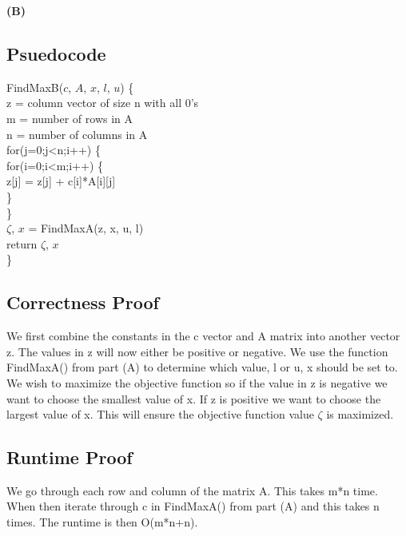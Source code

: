 \documentclass[11pt]{article}
\begin{document}
\medskip

\noindent\textbf{(B)}
\\
\subsection*{Psuedocode}
{\selectfont
FindMaxB($c$, $A$, $x$, $l$, $u$) \{ \\
\hspace*{1em} z = column vector of size n with all 0's \\
\hspace*{1em} m = number of rows in A \\
\hspace*{1em} n = number of columns in A \\
\hspace*{1em} for(j=0;j<n;i++) \{ \\
\hspace*{2em} for(i=0;i<m;i++) \{ \\
\hspace*{3em} z[j] = z[j] + c[i]*A[i][j] \\
\hspace*{2em} \} \\
\hspace*{1em} \} \\
\hspace*{1em} $\zeta$, $x$ = FindMaxA(z, x, u, l) \\
\hspace*{1em} return $\zeta$, $x$ \\
\}
}
\subsection*{Correctness Proof}
We first combine the constants in the c vector and A matrix into another vector z.  The values in z will now either be positive or negative.  We use the function FindMaxA() from part (A) to determine which value, l or u, x should be set to.  We wish to maximize the objective function so if the value in z is negative we want to choose the smallest value of x.  If z is positive we want to choose the largest value of x.  This will ensure the objective function value $\zeta$ is maximized.  
\subsection*{Runtime Proof}
We go through each row and column of the matrix A.  This takes m*n time.  When then iterate through c in FindMaxA() from part (A) and this takes n times.  The runtime is then O(m*n+n).
\end{document}
